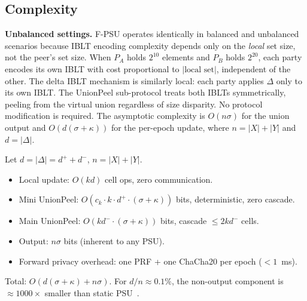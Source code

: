 \documentclass[letterpaper,twocolumn,10pt]{article}
\theoremstyle{definition}
\begin{document}
\subsection{Complexity}

\textbf{Unbalanced settings.} F-PSU operates identically in balanced and
unbalanced scenarios because IBLT encoding complexity depends only on the
\emph{local} set size, not the peer's set size. When $P_A$ holds $2^{10}$
elements and $P_B$ holds $2^{20}$, each party encodes its own IBLT with cost
proportional to $|\text{local set}|$, independent of the other. The delta
IBLT mechanism is similarly local: each party applies $\Delta$ only to its
own IBLT. The UnionPeel sub-protocol treats both IBLTs symmetrically,
peeling from the virtual union regardless of size disparity. No protocol
modification is required. The asymptotic complexity is $O(n\sigma)$ for the
union output and $O(d(\sigma + \kappa))$ for the per-epoch update, where
$n = |X| + |Y|$ and $d = |\Delta|$.

Let $d = |\Delta| = d^+ + d^-$, $n = |X| + |Y|$.
\begin{itemize}
\item Local update: $O(k d)$ cell ops, zero communication.
\item Mini UnionPeel: $O(c_k \cdot k \cdot d^+ \cdot (\sigma + \kappa))$ bits,
deterministic, zero cascade.
\item Main UnionPeel: $O(k d^- \cdot (\sigma + \kappa))$ bits, cascade $\leq
2k d^-$ cells.
\item Output: $n\sigma$ bits (inherent to any PSU).
\item Forward privacy overhead: one PRF + one ChaCha20 per epoch ($<1$~ms).
\end{itemize}
Total: $O(d(\sigma + \kappa) + n\sigma)$. For $d/n \approx 0.1\%$, the non-output
component is $\approx 1000\times$ smaller than static PSU~\cite{PT26}.

\begin{table}[t]
\centering
\footnotesize
\caption{Asymptotic comparison of PSU protocols ($d = |\Delta|$, $n = |X|+|Y|$).}
\label{tab:complexity}
\footnotesize
{}
\end{table}
\end{document}
